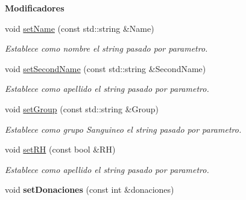 \begin{Indent}{\bf Modificadores}\par
\begin{DoxyCompactItemize}
\item 
void \hyperlink{classed_1_1Donante_a149c2f94803ea99ca0d322e1f54eb3e9}{set\+Name} (const std\+::string \&Name)
\begin{DoxyCompactList}\small\item\em Establece como nombre el string pasado por parametro. \end{DoxyCompactList}\item 
void \hyperlink{classed_1_1Donante_a28b1027f7ceddd66a48a5aad0ead0c43}{set\+Second\+Name} (const std\+::string \&Second\+Name)
\begin{DoxyCompactList}\small\item\em Establece como apellido el string pasado por parametro. \end{DoxyCompactList}\item 
void \hyperlink{classed_1_1Donante_a8e8d2ac356b88e9a83b6a3a573eb76af}{set\+Group} (const std\+::string \&Group)
\begin{DoxyCompactList}\small\item\em Establece como grupo Sanguineo el string pasado por parametro. \end{DoxyCompactList}\item 
void \hyperlink{classed_1_1Donante_ae0c5eed15e7f42de44bde8405e92f598}{set\+RH} (const bool \&RH)
\begin{DoxyCompactList}\small\item\em Establece como apellido el string pasado por parametro. \end{DoxyCompactList}\item 
void {\bfseries set\+Donaciones} (const int \&donaciones)\hypertarget{classed_1_1Donante_a93159ec1442d245ca6d7415e05b9ef3d}{}\label{classed_1_1Donante_a93159ec1442d245ca6d7415e05b9ef3d}

\end{DoxyCompactItemize}
\end{Indent}
